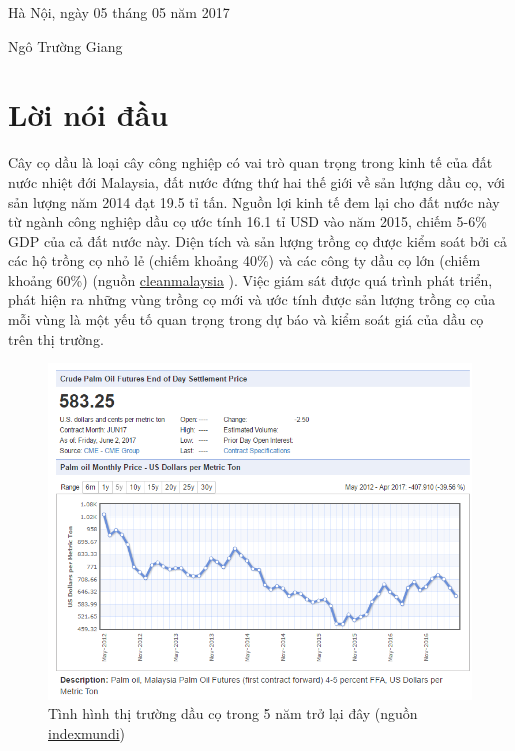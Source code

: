 \documentclass[14pt, oneside, a4paper, openany]{scrartcl}
\begin{document}
\begin{flushright}
	Hà Nội, ngày 05 tháng 05 năm 2017
\end{flushright}
\hspace{95 mm}Ngô Trường Giang

\newpage
\section{Lời nói đầu}
Cây cọ dầu là loại cây công nghiệp có vai trò quan trọng trong kinh tế của đất nước nhiệt đới Malaysia, đất nước đứng thứ hai thế giới về sản lượng dầu cọ, với sản lượng năm 2014 đạt 19.5 tỉ tấn. Nguồn lợi kinh tế đem lại cho đất nước này từ ngành công nghiệp dầu cọ ước tính 16.1 tỉ USD vào năm 2015, chiếm 5-6\% GDP của cả đất nước này. 
Diện tích và sản lượng trồng cọ được kiểm soát bởi cả các hộ trồng cọ nhỏ lẻ (chiếm khoảng 40\%) và các công ty dầu cọ lớn (chiếm khoảng 60\%) (nguồn \href{http://cleanmalaysia.com/2015/12/09/just-how-big-is-malaysias-palm-oil-industry/}{cleanmalaysia} \cite{cleanmalay}).
Việc giám sát được quá trình phát triển, phát hiện ra những vùng trồng cọ mới và ước tính được sản lượng trồng cọ của mỗi vùng là một yếu tố quan trọng trong dự báo và kiểm soát giá của dầu cọ trên thị trường.

\begin{figure}[!h]
	\centering
	\includegraphics[scale=0.8]{figures/oilPalmMarket.png} 
	\caption[Tình hình thị trường dầu cọ trong 5 năm trở lại đây]{Tình hình thị trường dầu cọ trong 5 năm trở lại đây (nguồn \href{http://www.indexmundi.com/commodities/?commodity=palm-oil&months=60}{indexmundi}\cite{indexmundi})}
\end{figure}
\end{document}
